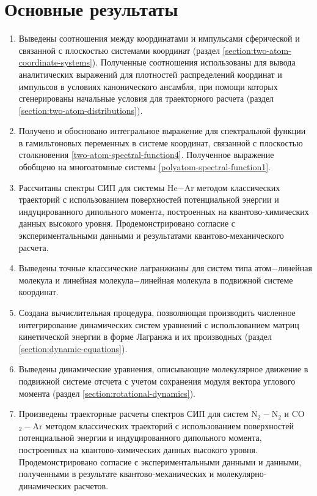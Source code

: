 \section*{Основные результаты}
\begin{enumerate}
    \item Выведены соотношения между координатами и импульсами сферической и связанной с плоскостью системами координат (раздел \ref{section:two-atom-coordinate-systems}). Полученные соотношения использованы для вывода  аналитических выражений для плотностей распределений координат и импульсов в условиях канонического ансамбля, при помощи которых сгенерированы начальные условия для траекторного расчета (раздел \ref{section:two-atom-distributions}).
    \item Получено и обосновано интегральное выражение для спектральной функции в гамильтоновых переменных в системе координат, связанной с плоскостью столкновения \eqref{two-atom-spectral-function4}. Полученное выражение обобщено на многоатомные системы \eqref{polyatom-spectral-function1}. 
    \item Рассчитаны спектры СИП для системы He$-$Ar методом классических траекторий с использованием поверхностей потенциальной энергии и индуцированного дипольного момента, построенных на квантово-химических данных высокого уровня. Продемонстрировано согласие с экспериментальными данными и результатами квантово-механического расчета. 
    \item Выведены точные классические лагранжианы для систем типа атом$-$линейная молекула и линейная молекула$-$линейная молекула в подвижной системе координат.
    \item Создана вычислительная процедура, позволяющая производить численное интегрирование динамических систем уравнений с использованием матриц кинетической энергии в форме Лагранжа и их производных (раздел \ref{section:dynamic-equations}).
    \item Выведены динамические уравнения, описывающие молекулярное движение в подвижной системе отсчета с учетом сохранения модуля вектора углового момента (раздел \ref{section:rotational-dynamics}).
    \item Произведены траекторные расчеты спектров СИП для систем N$_2-$N$_2$ и CO$_2-$Ar методом классических траекторий с использованием поверхностей потенциальной энергии и индуцированного дипольного момента, построенных на квантово-химических данных высокого уровня. Продемонстрировано согласие с экспериментальными данными и данными, полученными в результате квантово-механических и молекуляр\-но-динамических расчетов.
\end{enumerate}

